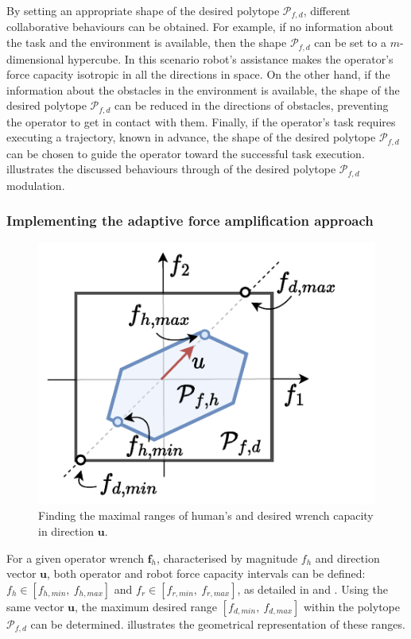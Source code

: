 By setting an appropriate shape of the desired polytope $\mathcal{P}_{f,d}$, different collaborative behaviours can be obtained. 
For example, if no information about the task and the environment is available, then the shape $\mathcal{P}_{f,d}$ can be set to a $m$-dimensional hypercube. In this scenario robot's assistance makes the operator's force capacity isotropic in all the directions in space.
On the other hand, if the information about the obstacles in the environment is available, the shape of the desired polytope $\mathcal{P}_{f,d}$ can be reduced in the directions of obstacles, preventing the operator to get in contact with them.
Finally, if the operator's task requires executing a trajectory, known in advance, the shape of the desired polytope $\mathcal{P}_{f,d}$ can be chosen to guide the operator toward the successful task execution.
 illustrates the discussed  behaviours through of the desired polytope $\mathcal{P}_{f,d}$ modulation.

\subsubsection*{Implementing the adaptive force amplification approach}

\begin{figure}
\vspace{-0.5cm}
    \includegraphics[trim=0.6cm 0cm 0.9cm 0.2cm,clip=true,width=\linewidth]{Papers/lichie/max_desired.pdf}
    \caption{Finding the maximal ranges of human's and desired wrench capacity in direction $\bm{u}$. }
    \label{fig:max_desired}
\end{figure}
For a given operator wrench $\bm{f}_h$, characterised by magnitude $f_h$ and direction vector $\bm{u}$, both operator and robot force capacity intervals can be defined: $f_h \in [f_{h,min}, ~f_{h,max}]$ and $f_r \in [f_{r,min}, ~f_{r,max}]$, as detailed in  and . Using the same vector $\bm{u}$, the maximum desired range $[f_{d,min}, ~f_{d,max}]$ within the polytope $\mathcal{P}_{f,d}$ can be determined.
 illustrates the geometrical representation of these ranges.

